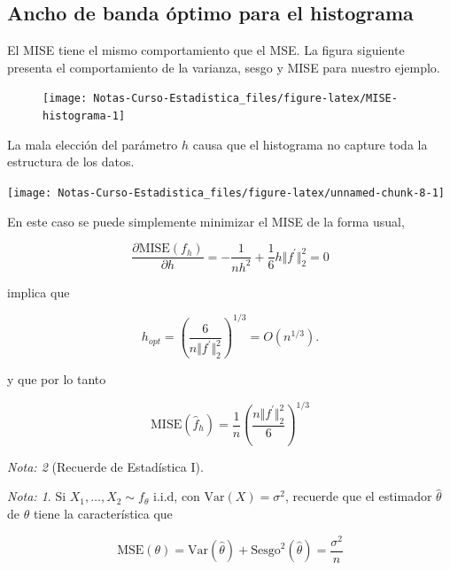 \documentclass[
  12pt,
]{book}
\theoremstyle{definition}
\theoremstyle{definition}
\theoremstyle{definition}
\theoremstyle{remark}
\newtheorem*{remark}{Nota: }
\begin{document}
\hypertarget{ancho-de-banda-uxf3ptimo-para-el-histograma}{%
\subsection{Ancho de banda óptimo para el histograma}\label{ancho-de-banda-uxf3ptimo-para-el-histograma}}

El MISE tiene el mismo comportamiento que el MSE. La figura siguiente presenta el comportamiento de la varianza, sesgo y MISE para nuestro ejemplo.

\begin{figure}

{\centering \texttt{[image: Notas-Curso-Estadistica\_files/figure-latex/MISE-histograma-1]} 

}

\caption{ }\label{fig:MISE-histograma}
\end{figure}

La mala elección del parámetro \(h\) causa que el histograma no capture toda la estructura de los datos.

\begin{center}\texttt{[image: Notas-Curso-Estadistica\_files/figure-latex/unnamed-chunk-8-1]} \end{center}

En este caso se puede simplemente minimizar el MISE de la forma usual,

\begin{equation*}
\frac{\partial \mathrm{MISE}(f_{h})}{\partial h} = -\frac{1}{nh^2} + \frac{1}{6} h \Vert f^\prime\Vert_{2}^2 = 0
\end{equation*}

implica que

\begin{equation*}
h_{opt} = \left(\frac{6}{n\Vert f^\prime\Vert_{2}^2}\right) ^{1/3} = O\left( n^{1/3} \right).
\end{equation*}

y que por lo tanto

\begin{equation*}
\mathrm{MISE}(\hat{f}_{h}) = \frac{1}{n} \left(\frac{n\Vert f^\prime\Vert_{2}^2}{6}\right)  ^{1/3}
\end{equation*}

\begin{remark}[Recuerde de Estadística I]
\begin{remark}

{}Si \(X_1, \ldots, X_2 \sim f_{\theta}\) i.i.d, con \(\mathrm{Var}(X) = \sigma^2\), recuerde que el estimador \(\hat{\theta}\) de \(\theta\) tiene la característica que

\begin{equation*}
\mathrm{MSE}(\theta) = \mathrm{Var}(\hat{\theta}) +
\mathrm{Sesgo}^2(\hat{\theta}) = \frac{\sigma^2}{n}
\end{equation*}

\end{remark}
\end{remark}
\end{document}
